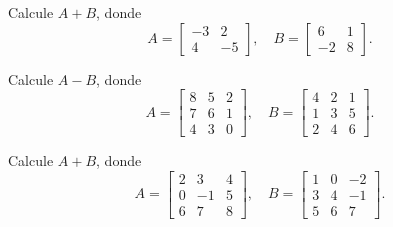 \begin{ejercicio}
Calcule $A+B$, donde
\[
A=\begin{bmatrix} -3 & 2 \\ 4 & -5 \end{bmatrix}, \quad
B=\begin{bmatrix} 6 & 1 \\ -2 & 8 \end{bmatrix}.
\]
\end{ejercicio}
\muestraSolucion{
\[
A+B=\begin{bmatrix} 3 & 3 \\ 2 & 3 \end{bmatrix}.
\]
}

\begin{ejercicio}
Calcule $A-B$, donde
\[
A=\begin{bmatrix} 8 & 5 & 2 \\ 7 & 6 & 1 \\ 4 & 3 & 0 \end{bmatrix}, \quad
B=\begin{bmatrix} 4 & 2 & 1 \\ 1 & 3 & 5 \\ 2 & 4 & 6 \end{bmatrix}.
\]
\end{ejercicio}
\muestraSolucion{
\[
A-B=\begin{bmatrix} 4 & 3 & 1 \\ 6 & 3 & -4 \\ 2 & -1 & -6 \end{bmatrix}.
\]
}

\begin{ejercicio}
Calcule $A+B$, donde
\[
A=\begin{bmatrix} 2 & 3 & 4 \\ 0 & -1 & 5 \\ 6 & 7 & 8 \end{bmatrix}, \quad
B=\begin{bmatrix} 1 & 0 & -2 \\ 3 & 4 & -1 \\ 5 & 6 & 7 \end{bmatrix}.
\]
\end{ejercicio}
\muestraSolucion{
\[
A+B=\begin{bmatrix} 3 & 3 & 2 \\ 3 & 3 & 4 \\ 11 & 13 & 15 \end{bmatrix}.
\]
}

